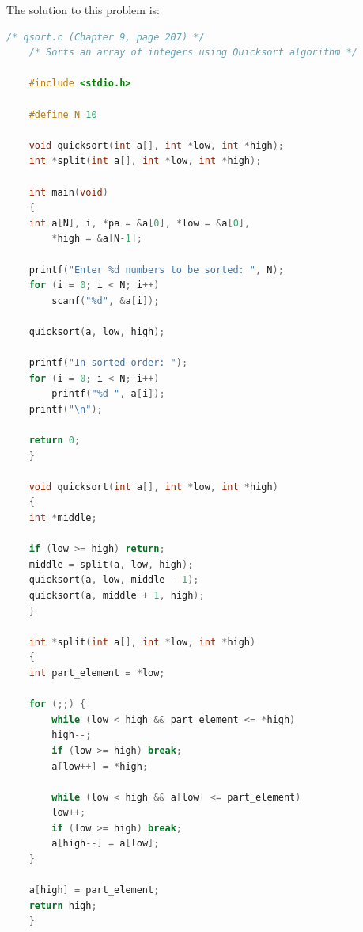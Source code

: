 \documentclass[12pt]{article}
\begin{document}
\begin{enumerate}[1.]
    The solution to this problem is:

    \bigskip

\begin{lstlisting}[language=c]
    /* qsort.c (Chapter 9, page 207) */
    /* Sorts an array of integers using Quicksort algorithm */

    #include <stdio.h>

    #define N 10

    void quicksort(int a[], int *low, int *high);
    int *split(int a[], int *low, int *high);

    int main(void)
    {
    int a[N], i, *pa = &a[0], *low = &a[0],
        *high = &a[N-1];

    printf("Enter %d numbers to be sorted: ", N);
    for (i = 0; i < N; i++)
        scanf("%d", &a[i]);

    quicksort(a, low, high);

    printf("In sorted order: ");
    for (i = 0; i < N; i++)
        printf("%d ", a[i]);
    printf("\n");

    return 0;
    }

    void quicksort(int a[], int *low, int *high)
    {
    int *middle;

    if (low >= high) return;
    middle = split(a, low, high);
    quicksort(a, low, middle - 1);
    quicksort(a, middle + 1, high);
    }

    int *split(int a[], int *low, int *high)
    {
    int part_element = *low;

    for (;;) {
        while (low < high && part_element <= *high)
        high--;
        if (low >= high) break;
        a[low++] = *high;

        while (low < high && a[low] <= part_element)
        low++;
        if (low >= high) break;
        a[high--] = a[low];
    }

    a[high] = part_element;
    return high;
    }
\end{lstlisting}

\end{enumerate}
\end{document}
